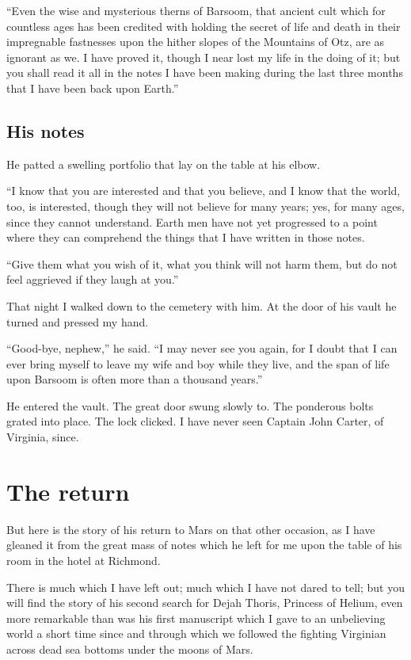\documentclass[11pt,a4paper,twocolumn]{article}
\begin{document}
``Even the wise and mysterious therns of Barsoom, that ancient cult which for
countless ages has been credited with holding the secret of life and death in
their impregnable fastnesses upon the hither slopes of the Mountains of Otz,
are as ignorant as we.  I have proved it, though I near lost my life in the
doing of it; but you shall read it all in the notes I have been making during
the last three months that I have been back upon Earth.''

\subsection{His notes}

He patted a swelling portfolio that lay on the table at his elbow.

``I know that you are interested and that you believe, and I know that the
world, too, is interested, though they will not believe for many years; yes,
for many ages, since they cannot understand.  Earth men have not yet progressed
to a point where they can comprehend the things that I have written in those
notes.

``Give them what you wish of it, what you think will not harm them, but do not
feel aggrieved if they laugh at you.''

That night I walked down to the cemetery with him.  At the door of his vault he
turned and pressed my hand.

``Good-bye, nephew,'' he said.  ``I may never see you again, for I doubt that I
can ever bring myself to leave my wife and boy while they live, and the span of
life upon Barsoom is often more than a thousand years.''

He entered the vault.  The great door swung slowly to.  The ponderous bolts
grated into place.  The lock clicked.  I have never seen Captain John Carter,
of Virginia, since.

\section{The return}

But here is the story of his return to Mars on that other occasion, as
I have gleaned it from the great mass of notes which he left for me
upon the table of his room in the hotel at Richmond.

There is much which I have left out; much which I have not dared to
tell; but you will find the story of his second search for Dejah
Thoris, Princess of Helium, even more remarkable than was his first
manuscript which I gave to an unbelieving world a short time since and
through which we followed the fighting Virginian across dead sea
bottoms under the moons of Mars.
\end{document}
